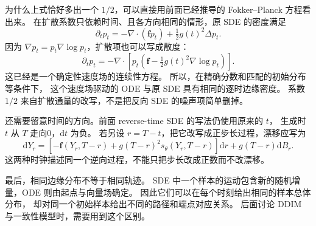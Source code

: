 为什么上式恰好多出一个 $1/2$，可以直接用前面已经推导的 Fokker--Planck 方程看出来。
在扩散系数只依赖时间、且各方向相同的情形，原 SDE 的密度满足
\[
\partial_t p_t=-\nabla\cdot(\mathbf f p_t)+\tfrac12g(t)^2\Delta p_t.
\]
因为 $\nabla p_t=p_t\nabla\log p_t$，扩散项也可以写成散度：
\[
\partial_t p_t=-\nabla\cdot\left[
 p_t\left(\mathbf f-\tfrac12g(t)^2\nabla\log p_t\right)\right].
\]
这已经是一个确定性速度场的连续性方程。
所以，在精确分数和匹配的初始分布等条件下，
这个速度场驱动的 ODE 与原 SDE 具有相同的逐时边缘密度。
系数 $1/2$ 来自扩散通量的改写，不是把反向 SDE 的噪声项简单删掉。

还需要留意时间的方向。前面 reverse-time SDE 的写法仍使用原来的 $t$，
生成时 $t$ 从 $T$ 走向0，$\mathrm dt$ 为负。
若另设 $r=T-t$，把它改写成正步长过程，漂移应写为
\[
\mathrm dY_r=\left[-\mathbf f(Y_r,T-r)+g(T-r)^2s_\theta(Y_r,T-r)\right]\mathrm dr
 +g(T-r)\mathrm dB_r.
\]
这两种时钟描述同一个逆向过程，不能只把步长改成正数而不改漂移。

最后，相同边缘分布不等于相同轨迹。
SDE 中一个样本的运动包含新的随机增量，ODE 则由起点与向量场确定。
因此它们可以在每个时刻给出相同的样本总体分布，
却对同一个初始样本给出不同的路径和端点对应关系。
后面讨论 DDIM 与一致性模型时，需要用到这个区别。\cite{sde,theorybook}
